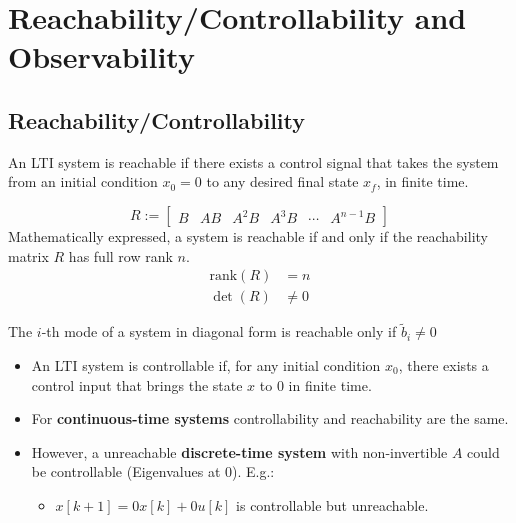 \section{Reachability/Controllability and Observability}

\subsection{Reachability/Controllability}

An LTI system is reachable if there exists a control signal that takes the system from an initial condition $x_0 = 0$ to any desired final state $x_f$, in finite time.

\begin{equation*}
    R:= \begin{bmatrix}
        B & AB & A^2B & A^3B & \cdots & A^{n-1}B
    \end{bmatrix}
\end{equation*}
Mathematically expressed, a system is reachable if and only if the reachability matrix $R$ has full row rank $n$.
\begin{align*}
    \text{rank}(R) & = n    \\
    \det(R)        & \neq 0
\end{align*}


The $i$-th mode of a system in diagonal form is reachable only if $\tilde{b}_i \neq 0$


\begin{itemize}
    \item An LTI system is controllable if, for any initial condition $x_0$, there exists a control input that brings the state $x$ to $0$ in finite time.
    \item For \textbf{continuous-time systems} controllability and reachability are the same.
    \item However, a unreachable \textbf{discrete-time system} with non-invertible $A$ could be controllable (Eigenvalues at 0). E.g.:
    \begin{itemize}
        \item $x[k+1] = 0x[k] + 0u[k]$ is controllable but unreachable.
    \end{itemize}
\end{itemize}


